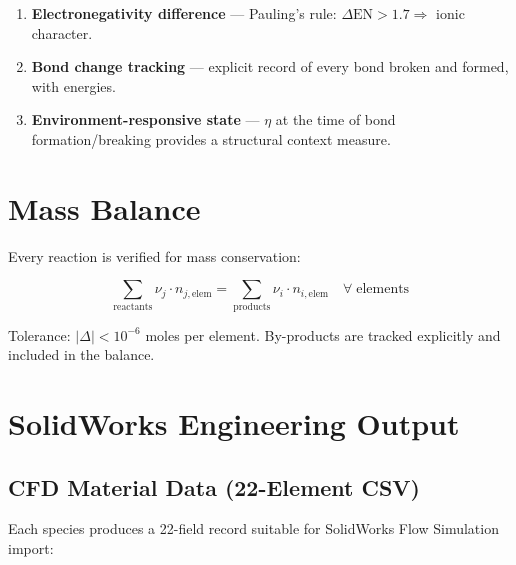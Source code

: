 \documentclass[11pt,a4paper]{article}
\begin{document}
\begin{enumerate}[label=\arabic*.]
    \item \textbf{Electronegativity difference} --- Pauling's rule:
          $\Delta\text{EN} > 1.7 \Rightarrow$ ionic character.
    \item \textbf{Bond change tracking} --- explicit record of every bond
          broken and formed, with energies.
    \item \textbf{Environment-responsive state} --- $\eta$ at the time of
          bond formation/breaking provides a structural context measure.
\end{enumerate}

\section{Mass Balance}
\label{sec:balance}

Every reaction is verified for mass conservation:

\begin{equation}
    \sum_{\text{reactants}} \nu_j \cdot n_{j,\text{elem}}
    = \sum_{\text{products}} \nu_i \cdot n_{i,\text{elem}}
    \quad \forall \; \text{elements}
\end{equation}

Tolerance: $|\Delta| < 10^{-6}$ moles per element.  By-products are
tracked explicitly and included in the balance.

\section{SolidWorks Engineering Output}
\label{sec:solidworks}

\subsection{CFD Material Data (22-Element CSV)}

Each species produces a 22-field record suitable for SolidWorks Flow
Simulation import:
\end{document}
